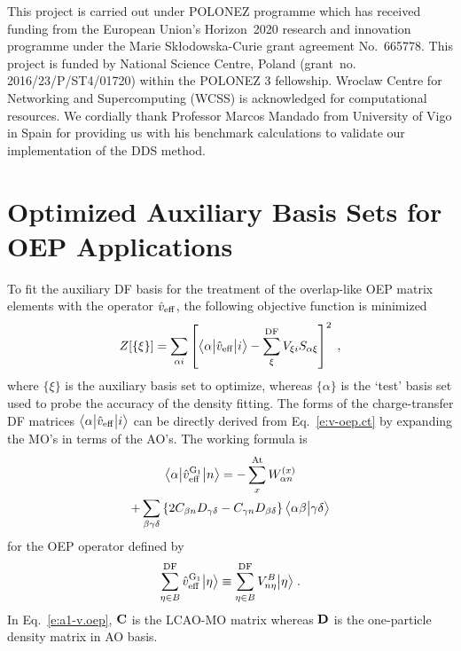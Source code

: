 \documentclass[aip,jcp,amsmath,amssymb,reprint,floatfix]{revtex4-1}
\begin{document}

\begin{acknowledgments}
This project is carried out under POLONEZ programme which has received funding from the European Union's
Horizon~2020 research and innovation programme under the Marie Sk{\l}odowska-Curie grant agreement 
No.~665778. This project is funded by National Science Centre, Poland 
(grant~no. 2016/23/P/ST4/01720) within the POLONEZ 3 fellowship.
Wroclaw Centre for Networking and Supercomputing (WCSS) is acknowledged for
computational resources.
We cordially thank Professor Marcos Mandado from University of Vigo in Spain
for providing us with his benchmark calculations to validate our implementation
of the DDS method.
\end{acknowledgments}

\appendix

\section{Optimized Auxiliary Basis Sets for OEP Applications\label{a:auxiliary-basis}}

To fit the auxiliary DF basis for the treatment of the overlap\hyp{}like
OEP matrix elements with the operator $\hat{v}_{\rm eff}$, 
the following objective function is minimized
%
\begin{equation} \label{e:a1-obj}
 Z[\{\xi\}] = \sum_{\alpha i} \left[ 
     \tBraKet{\alpha}{\hat{v}_{\rm eff}}{i} - 
     \sum_{\xi}^{\rm DF} V_{\xi i} S_{\alpha \xi} 
    \right]^2 \;,
\end{equation}
%
where $\{\xi\}$ is the auxiliary basis set to optimize, whereas $\{\alpha\}$
is the `test' basis set used to probe the accuracy of the density fitting.
The forms of the %
charge\hyp{}transfer DF matrices $\tBraKet{\alpha}{\hat{v}_{\rm eff}}{i}$
can be directly derived 
from Eq.~\eqref{e:v-oep.ct}
by expanding the MO's in terms of the AO's. The working formula
is %
%
\begin{multline} \label{e:a1-v.oep}
   \tBraKet{\alpha}{\hat{v}_{\rm eff}^{{\rm G}_1}}{n} 
     = -\sum_{x}^{\rm At} W_{\alpha n}^{(x)}   \\
       + \sum_{\beta\gamma\delta} 
           \left\{
             2 C_{\beta n} D_{\gamma\delta} - C_{\gamma n} D_{\beta \delta}
           \right\}
           \BraKet{\alpha\beta}{\gamma\delta}
\end{multline}
%
for the OEP operator defined by 
%
\begin{equation}
 \sum_{\eta\in B}^{\rm DF} \hat{v}_{\rm eff}^{{\rm G}_1} \Ket{\eta} \equiv 
 \sum_{\eta\in B}^{\rm DF} V^B_{n\eta} \Ket{\eta} \;.
\end{equation}
%
In Eq.~\eqref{e:a1-v.oep}, ${\bf C}$ is the LCAO\hyp{}MO matrix whereas ${\bf D}$
is the one\hyp{}particle density matrix in AO basis.
\end{document}
